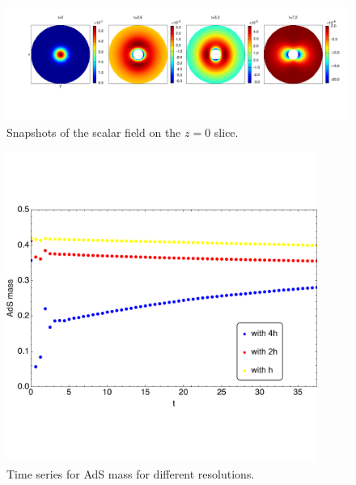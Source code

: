 \documentclass[12pt]{iopart}
\begin{document}
\begin{figure}[h]
        \centering
        \includegraphics[width=7.0in,clip=true]{plots/bulkplots/L3/phi1/phi1_L3_snapshots_2.pdf}
\parbox{5.0in}{\caption{Snapshots of the scalar field on the $z=0$ slice.
        }\label{fig:snapshotsscalarfield-crop}}
\end{figure}

\begin{figure}[h]
        \centering
        \includegraphics[width=4.0in,clip=true]{plots/timeseries/AdSmass/fullplotAdSmassL1L2L3res-cropped.pdf}
\parbox{5.0in}{\caption{Time series for AdS mass for different resolutions.
        }\label{fig:AdSmass-crop}}
\end{figure}
\end{document}
